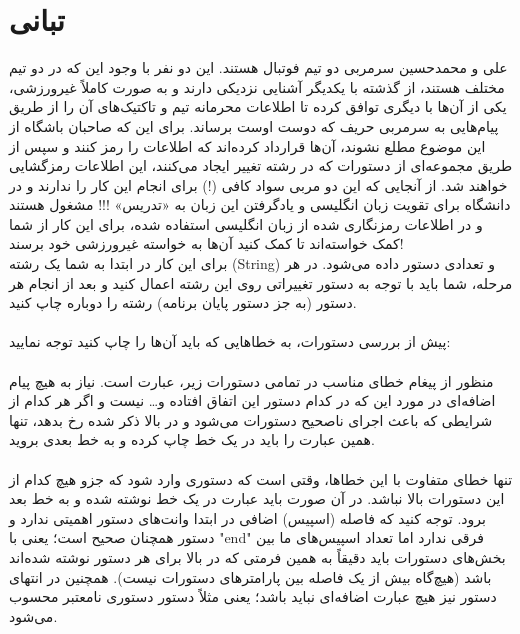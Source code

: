 \documentclass[]{article}
\begin{document}
\newpage
\section{تبانی}


علی و محمدحسین سرمربی دو تیم فوتبال هستند. این دو نفر با وجود این که در دو تیم مختلف هستند، از گذشته با یکدیگر آشنایی نزدیکی دارند و به صورت کاملاً غیرورزشی، یکی از آن‌ها با دیگری توافق کرده تا اطلاعات محرمانه تیم و تاکتیک‌های آن را از طریق پیام‌هایی به سرمربی حریف که دوست اوست برساند. برای این که صاحبان باشگاه از این موضوع مطلع نشوند، آن‌ها قرارداد کرده‌اند که اطلاعات را رمز کنند و سپس از طریق مجموعه‌ای از دستورات که در رشته تغییر ایجاد می‌کنند، این اطلاعات رمزگشایی خواهند شد. از آنجایی که این دو مربی سواد کافی (!) برای انجام این کار را ندارند و در دانشگاه برای تقویت زبان انگلیسی و یادگرفتن این زبان به «تدریس» !!! مشغول هستند و در اطلاعات رمزنگاری شده از زبان انگلیسی استفاده شده، برای این کار از شما کمک خواسته‌اند تا کمک کنید آن‌ها به خواسته غیرورزشی خود برسند!\\
برای این کار در ابتدا به شما یک رشته (String) و تعدادی دستور داده می‌شود. در هر مرحله، شما باید با توجه به دستور تغییراتی روی این رشته اعمال کنید و بعد از انجام هر دستور (به جز دستور پایان برنامه) رشته را دوباره چاپ کنید.\\\\
پیش از بررسی دستورات، به خطاهایی که باید آن‌ها را چاپ کنید توجه نمایید:\\\\
منظور از پیغام خطای مناسب در تمامی دستورات زیر، عبارت 
است. نیاز به هیچ پیام اضافه‌ای در مورد این که در کدام دستور این اتفاق افتاده و… نیست و اگر هر کدام از شرایطی که باعث اجرای ناصحیح دستورات می‌شود و در بالا ذکر شده رخ بدهد، تنها همین عبارت را باید در یک خط چاپ کرده و به خط بعدی بروید.\\\\
تنها خطای متفاوت با این خطاها، وقتی است که دستوری وارد شود که جزو هیچ کدام از این دستورات بالا نباشد. در آن صورت باید عبارت 
 در یک خط نوشته شده و به خط بعد برود. توجه کنید که فاصله (اسپیس) اضافی در ابتدا وانت‌های دستور اهمیتی ندارد و دستور همچنان صحیح است؛ یعنی 
  با "end" فرقی ندارد اما تعداد اسپیس‌های ما بین بخش‌های دستورات باید دقیقاً به همین فرمتی که در بالا برای هر دستور نوشته شده‌اند باشد (هیچ‌گاه بیش از یک فاصله بین پارامترهای دستورات نیست). همچنین در انتهای دستور نیز هیچ عبارت اضافه‌ای نباید باشد؛ یعنی مثلاً دستور 
   دستوری نامعتبر محسوب می‌شود.
\end{document}
